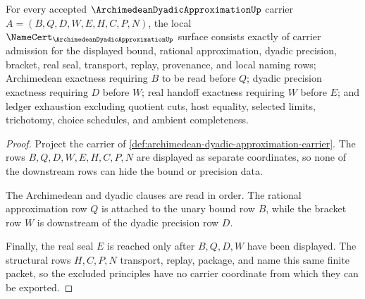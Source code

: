 \begin{theorem}
\label{thm:archimedean-dyadic-approximation-obligations}
For every accepted $\ArchimedeanDyadicApproximationUp$ carrier $A=(B,Q,D,W,E,H,C,P,N)$, the local $\NameCert_{\ArchimedeanDyadicApproximationUp}$ surface consists exactly of carrier admission for the displayed bound, rational approximation, dyadic precision, bracket, real seal, transport, replay, provenance, and local naming rows; Archimedean exactness requiring $B$ to be read before $Q$; dyadic precision exactness requiring $D$ before $W$; real handoff exactness requiring $W$ before $E$; and ledger exhaustion excluding quotient cuts, host equality, selected limits, trichotomy, choice schedules, and ambient completeness.
\end{theorem}
\begin{proof}
Project the carrier of \autoref{def:archimedean-dyadic-approximation-carrier}. The rows $B,Q,D,W,E,H,C,P,N$ are displayed as separate coordinates, so none of the downstream rows can hide the bound or precision data.

The Archimedean and dyadic clauses are read in order. The rational approximation row $Q$ is attached to the unary bound row $B$, while the bracket row $W$ is downstream of the dyadic precision row $D$.

Finally, the real seal $E$ is reached only after $B,Q,D,W$ have been displayed. The structural rows $H,C,P,N$ transport, replay, package, and name this same finite packet, so the excluded principles have no carrier coordinate from which they can be exported.
\end{proof}

